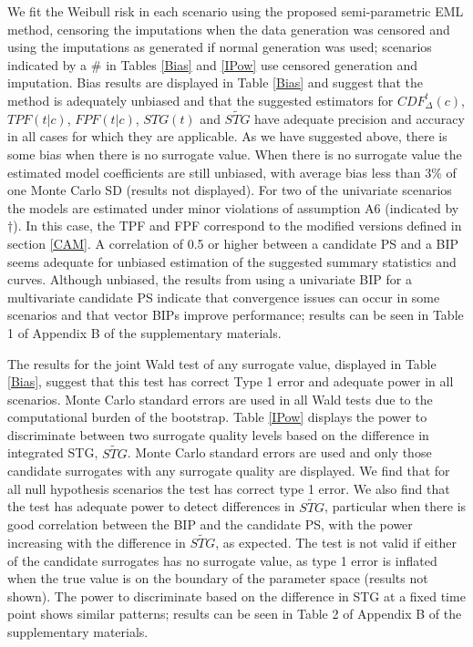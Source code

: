 \documentclass[times, doublespace]{simauth}
\begin{document}
We fit the Weibull risk in each scenario using the proposed semi-parametric EML method, censoring the imputations when the data generation was censored and using the imputations as generated if normal generation was used; scenarios indicated by a $\#$ in Tables \ref{Bias} and \ref{IPow} use censored generation and imputation. Bias results are displayed in Table \ref{Bias} and suggest that the method is adequately unbiased and that the suggested estimators for $CDF^{t}_{\Delta}(c)$, $TPF(t|c)$, $FPF(t|c)$, $STG(t)$ and $\widetilde{STG}$ have adequate precision and accuracy in all cases for which they are applicable. As we have suggested above, there is some bias when there is no surrogate value. When there is no surrogate value the estimated model coefficients are still unbiased, with average bias less than 3\% of one Monte Carlo SD (results not displayed). For two of the univariate scenarios the models are estimated under minor violations of assumption A6 (indicated by $\dagger$). In this case, the TPF and FPF correspond to the modified versions defined in section \ref{CAM}. A correlation of 0.5 or higher between a candidate PS and a BIP seems adequate for unbiased estimation of the suggested summary statistics and curves. Although unbiased, the results from using a univariate BIP for a multivariate candidate PS indicate that convergence issues can occur in some scenarios and that vector BIPs improve performance; results can be seen in Table 1 of Appendix B of the supplementary materials. 

The results for the joint Wald test of any surrogate value, displayed in Table \ref{Bias}, suggest that this test has correct Type 1 error and adequate power in all scenarios. Monte Carlo standard errors are used in all Wald tests due to the computational burden of the bootstrap. Table \ref{IPow} displays the power to discriminate between two surrogate quality levels based on the difference in integrated STG, $\widetilde{STG}$. Monte Carlo standard errors are used and only those candidate surrogates with any surrogate quality are displayed. We find that for all null hypothesis scenarios the test has correct type 1 error. We also find that the test has adequate power to detect differences in $\widetilde{STG}$, particular when there is good correlation between the BIP and the candidate PS, with the power increasing with the difference in $\widetilde{STG}$, as expected. The test is not valid if either of the candidate surrogates has no surrogate value, as type 1 error is inflated when the true value is on the boundary of the parameter space (results not shown). The power to discriminate based on the difference in STG at a fixed time point shows similar patterns; results can be seen in Table 2 of Appendix B of the supplementary materials.
\end{document}
